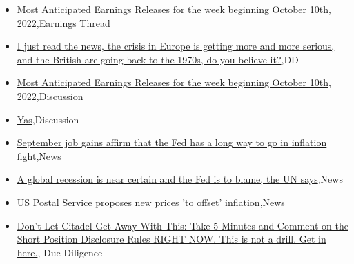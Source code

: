 \documentclass{article}%
\begin{document}
%
\begin{itemize}%
\item%
\href{https://reddit.com/r/wallstreetbets/comments/xyrnp0/most\_anticipated\_earnings\_releases\_for\_the\_week/}{Most Anticipated Earnings Releases for the week beginning October 10th, 2022},Earnings Thread%
\item%
\href{https://reddit.com/r/wallstreetbets/comments/xyrbkr/i\_just\_read\_the\_news\_the\_crisis\_in\_europe\_is/}{I just read the news, the crisis in Europe is getting more and more serious, and the British are going back to the 1970s, do you believe it?},DD%
\item%
\href{https://reddit.com/r/StockMarket/comments/xyrof0/most\_anticipated\_earnings\_releases\_for\_the\_week/}{Most Anticipated Earnings Releases for the week beginning October 10th, 2022},Discussion%
\item%
\href{https://reddit.com/r/StockMarket/comments/xygwif/yas/}{Yas},Discussion%
\item%
\href{https://reddit.com/r/Economics/comments/xymw9i/september\_job\_gains\_affirm\_that\_the\_fed\_has\_a/}{September job gains affirm that the Fed has a long way to go in inflation fight},News%
\item%
\href{https://reddit.com/r/Economics/comments/xyjsmn/a\_global\_recession\_is\_near\_certain\_and\_the\_fed\_is/}{A global recession is near certain and the Fed is to blame, the UN says},News%
\item%
\href{https://reddit.com/r/Economics/comments/xyh9j2/us\_postal\_service\_proposes\_new\_prices\_to\_offset/}{US Postal Service proposes new prices 'to offset' inflation},News%
\item%
\href{https://reddit.com/r/Superstonk/comments/xypz9m/dont\_let\_citadel\_get\_away\_with\_this\_take\_5/}{Don't Let Citadel Get Away With This: Take 5 Minutes and Comment on the Short Position Disclosure Rules RIGHT NOW. This is not a drill. Get in here.}, Due Diligence%
\end{itemize}%
\end{document}
